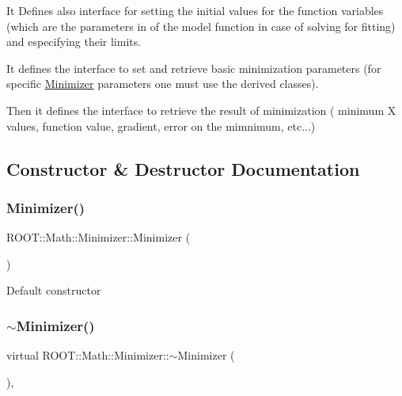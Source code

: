 It Defines also interface for setting the initial values for the function variables (which are the parameters in of the model function in case of solving for fitting) and especifying their limits.

It defines the interface to set and retrieve basic minimization parameters (for specific \mbox{\hyperlink{classROOT_1_1Math_1_1Minimizer}{Minimizer}} parameters one must use the derived classes).

Then it defines the interface to retrieve the result of minimization ( minimum X values, function value, gradient, error on the mimnimum, etc...) 

\subsection{Constructor \& Destructor Documentation}
\mbox{\label{classROOT_1_1Math_1_1Minimizer_a6981643dac29da36280b24d32b6d3140}} 
\subsubsection{\texorpdfstring{Minimizer()}{Minimizer()}\hspace{0.1cm}{\footnotesize\ttfamily [1/2]}}
{\footnotesize\ttfamily R\+O\+O\+T\+::\+Math\+::\+Minimizer\+::\+Minimizer (\begin{DoxyParamCaption}{ }\end{DoxyParamCaption})\hspace{0.3cm}{\ttfamily [inline]}}

Default constructor \mbox{\label{classROOT_1_1Math_1_1Minimizer_aa1045455fe657956659bfa7a21ce447e}} 
\subsubsection{\texorpdfstring{$\sim$Minimizer()}{~Minimizer()}\hspace{0.1cm}{\footnotesize\ttfamily [1/2]}}
{\footnotesize\ttfamily virtual R\+O\+O\+T\+::\+Math\+::\+Minimizer\+::$\sim$\+Minimizer (\begin{DoxyParamCaption}{ }\end{DoxyParamCaption})\hspace{0.3cm}{\ttfamily [inline]}, {\ttfamily [virtual]}}

